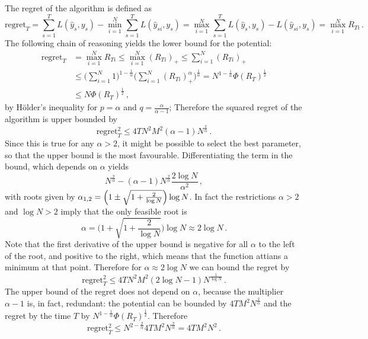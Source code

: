 \documentclass[a4paper]{article}
\begin{document}
The regret of the algorithm is defined as
\begin{equation*}
  \text{regret}_T
    = \sum_{s=1}^T L(\hat{y}_s, y_s)
    - \min_{i=1}^N \sum_{s=1}^T L(\hat{y}_{si}, y_s)
    = \max_{i=1}^N \sum_{s=1}^T
        L(\hat{y}_s, y_s) - L(\hat{y}_{si}, y_s)
    = \max_{i=1}^N R_{Ti} \,.
\end{equation*}
The following chain of reasoning yields the lower bound for the potential:
\begin{align*}
  \text{regret}_T
    &= \max_{i=1}^N R_{Ti}
    \leq \max_{i=1}^N (R_{Ti})_+
    \leq \sum_{i=1}^N (R_{Ti})_+ \\
    &\leq \bigl(\sum_{i=1}^N 1 \bigr)^{1-\frac{1}{\alpha}}
         \biggl( \sum_{i=1}^N (R_{Ti})_+^\alpha \biggr)^\frac{1}{\alpha}
    = N^{1-\frac{1}{\alpha}} \Phi(R_T)^\frac{1}{2} \\
    &\leq N \Phi(R_T)^\frac{1}{2} \,,
\end{align*}
by H\"older's inequality for $p=\alpha$ and $q=\frac{\alpha}{\alpha-1}$;
Therefore the squared regret of the algorithm is upper bounded by
\begin{equation*}
  \text{regret}_T^2
    \leq 4 T N^2 M^2 (\alpha-1) N^\frac{2}{\alpha} \,.
\end{equation*}
Since this is true for any $\alpha > 2$, it might be possible to select the best
parameter, so that the upper bound is the most favourable. Differentiating the term
in the bound, which depends on $\alpha$ yields
\begin{equation*}
  N^\frac{2}{\alpha} - (\alpha - 1) N^\frac{2}{\alpha} \frac{2\log N}{\alpha^2} \,,
\end{equation*}
with roots given by $\alpha_{1,2} = \Bigl(1 \pm  \sqrt{1 + \frac{2}{\log N}} \Bigr) \log N$.
In fact the restrictions $\alpha > 2$ and $\log N > 2$ imply that the only feasible
root is
\begin{equation*}
  \alpha
    = \biggl(1 + \sqrt{1 + \frac{2}{\log N}} \biggr) \log N
    \approx 2\log N\,.
\end{equation*}
Note that the first derivative of the upper bound is negative for all $\alpha$ to
the left of the root, and positive to the right, which means that the function attians
a minimum at that point. Therefore for $\alpha \approx 2\log N$ we can bound the
regret by
\begin{equation*}
  \text{regret}_T^2
    \leq 4 T N^2 M^2 (2\log N - 1) N^\frac{1}{\log N} \,.
\end{equation*}
The upper bound of the regret does not depend on $\alpha$, because the multiplier
$\alpha-1$ is, in fact, redundant: the potential can be bounded by $4TM^2 N^\frac{2}{\alpha}$
and the regret by the time $T$ by $N^{1-\frac{1}{\alpha}} \Phi(R_T)^\frac{1}{2}$.
Therefore
\begin{equation*}
  \text{regret}_T^2
    \leq N^{2-\frac{2}{\alpha}} 4TM^2 N^\frac{2}{\alpha}
    = 4TM^2 N^2 \,.
\end{equation*}


\end{document}
